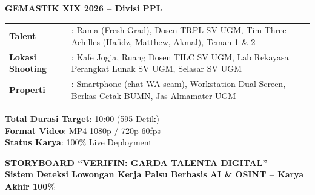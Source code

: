 \documentclass[a4paper,landscape,10pt]{article}
\begin{document}
\begin{minipage}[t]{0.70\textwidth}
\textbf{GEMASTIK XIX 2026 -- Divisi PPL} \\
\begin{tabular}{@{}ll@{}}
\textbf{Talent} & : Rama (Fresh Grad), Dosen TRPL SV UGM, Tim Three Achilles (Hafidz, Matthew, Akmal), Teman 1 \& 2 \\
\textbf{Lokasi Shooting} & : Kafe Jogja, Ruang Dosen TILC SV UGM, Lab Rekayasa Perangkat Lunak SV UGM, Selasar SV UGM \\
\textbf{Properti} & : Smartphone (chat WA scam), Workstation Dual-Screen, Berkas Cetak BUMN, Jas Almamater UGM \\
\end{tabular}
\end{minipage}
\hfill
\begin{minipage}[t]{0.28\textwidth}
\raggedleft
\textbf{Total Durasi Target}: 10:00 (595 Detik) \\
\textbf{Format Video}: MP4 1080p / 720p 60fps \\
\textbf{Status Karya}: 100\% Live Deployment \\
\end{minipage}

\vspace{0.25cm}
\begin{center}
{\Large \textbf{STORYBOARD ``VERIFIN: GARDA TALENTA DIGITAL''}} \\
\vspace{0.08cm}
{\small \textbf{Sistem Deteksi Lowongan Kerja Palsu Berbasis AI \& OSINT -- Karya Akhir 100\%}}
\end{center}
\vspace{0.15cm}
\end{document}
